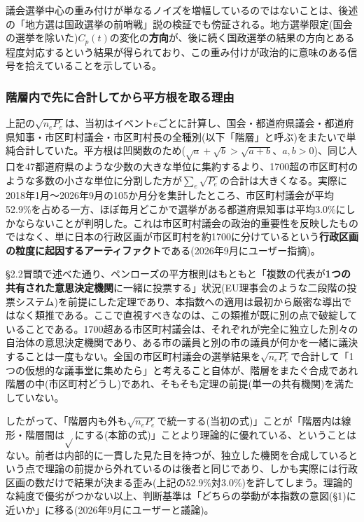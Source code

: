 \documentclass[a4paper,11pt]{ltjsarticle}
\begin{document}
議会選挙中心の重み付けが単なるノイズを増幅しているのではないことは、後述の「地方選は国政選挙の前哨戦」説の検証でも傍証される。地方選挙限定(国会の選挙を除いた)$C_p(t)$の変化の\textbf{方向}が、後に続く国政選挙の結果の方向とある程度対応するという結果が得られており、この重み付けが政治的に意味のある信号を拾えていることを示している。

\subsubsection{階層内で先に合計してから平方根を取る理由}
\label{sec:level-aggregation}

上記の$\sqrt{n_eP_e}$は、当初はイベント$e$ごとに計算し、国会・都道府県議会・都道府県知事・市区町村議会・市区町村長の全種別(以下「階層」と呼ぶ)をまたいで単純合計していた。平方根は凹関数のため($\sqrt{a}+\sqrt{b} > \sqrt{a+b}$、$a,b>0$)、同じ人口を47都道府県のような少数の大きな単位に集約するより、1700超の市区町村のような多数の小さな単位に分割した方が$\sum_e\sqrt{P_e}$の合計は大きくなる。実際に2018年1月〜2026年9月の105か月分を集計したところ、市区町村議会が平均52.9\%を占める一方、ほぼ毎月どこかで選挙がある都道府県知事は平均3.0\%にしかならないことが判明した。これは市区町村議会の政治的重要性を反映したものではなく、単に日本の行政区画が市区町村を約1700に分けているという\textbf{行政区画の粒度に起因するアーティファクト}である(2026年9月にユーザー指摘)。

\S2.2冒頭で述べた通り、ペンローズの平方根則はもともと「複数の代表が\textbf{1つの共有された意思決定機関}に一緒に投票する」状況(EU理事会のような二段階の投票システム)を前提にした定理であり、本指数への適用は最初から厳密な導出ではなく類推である。ここで直視すべきなのは、この類推が既に別の点で破綻していることである。1700超ある市区町村議会は、それぞれが完全に独立した別々の自治体の意思決定機関であり、ある市の議員と別の市の議員が何かを一緒に議決することは一度もない。全国の市区町村議会の選挙結果を$\sqrt{n_eP_e}$で合計して「1つの仮想的な議事堂に集めたら」と考えること自体が、階層をまたぐ合成であれ階層の中(市区町村どうし)であれ、そもそも定理の前提(単一の共有機関)を満たしていない。

したがって、「階層内も外も$\sqrt{n_eP_e}$で統一する(当初の式)」ことが「階層内は線形・階層間は$\sqrt{}$にする(本節の式)」ことより理論的に優れている、ということはない。前者は内部的に一貫した見た目を持つが、独立した機関を合成しているという点で理論の前提から外れているのは後者と同じであり、しかも実際には行政区画の数だけで結果が決まる歪み(上記の52.9\%対3.0\%)を許してしまう。理論的な純度で優劣がつかない以上、判断基準は「どちらの挙動が本指数の意図(\S1)に近いか」に移る(2026年9月にユーザーと議論)。
\end{document}
